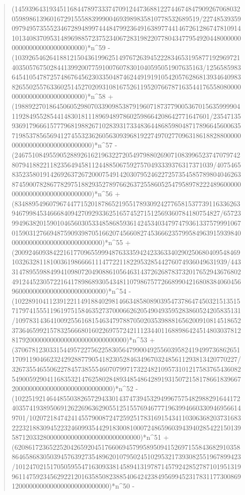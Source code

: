 \documentclass[11pt,a4paper]{article}
\theoremstyle{plain}
\theoremstyle{definition}
\begin{document}
\begin{quote}
(14593964319345116844789733374709124473688122744674847909267068032059898613960167291555883999004693989835810778532689519/22748539359097949573555234672894899744484799236491638977441467261286747810914101340837095314896988572375234067283198220778043477954920448000000000000000000000000000)*n\^{}59 - (103926546264188121504361996251497672639452228346531958771929697214035057675028441399200775910076078301040595051907635163/1256585983645410547872574867645623033504874624491919105420576286813934640983826550255763360251452702093108167526119520766787163544176558080000000000000000000000000)*n\^{}58 + (19889227018645060529807033909853879196071873779005367015635999904119284955285441483018111896948978602598664208642771647601/2354713593691796661577796819882671028393173348364486859804871789664560063571985378565694127455323626056309396819227497027709631861882880000000000000000000000000000)*n\^{}57 - (246751084955905288926162196322720549798802690710839965237470797428079418822118235649458112448850675927570493339376317371039/407546583523580191426926372672000754914203079524622725735458578980404626387459007828677829751882935278976626372558605254795897822248960000000000000000000000000000)*n\^{}56 + (83488954960796744771520187865219551789309242776581537739116336263946799845346668409427092933625165745271512569360784180754827/6572399496382015901046560305334858685936142453403479747936133757999106701590312766948759093987051662074566082745366623579958496391593984000000000000000000000000000)*n\^{}55 + (2009246093842216177096559994876333594242336334029025068040954846910326328118100361986666111477221182295328544276074936049631939/443314789559884994109807204908861056463143726268783732017652943676802491244523057221641789868930543481107986757726689904216808384060456960000000000000000000000000)*n\^{}54 - (10228910411239122114918840298146634858089039547378647450321513515717974155511961975158463527370006626205490493595283860524205835131/10978314364100925561681546347978870502035398881656200910814518652373646599215783256668016022697572421112344011688986424514803037812817920000000000000000000000000000)*n\^{}53 + (3706781230331544957227562258305647990049255603958241949973686265117091190466232429288779054182305284634967032485611293813420770227/32673554655062278457385554607079971732248210957310121758376543608254900592904116835321476258028489348548642891931507215817866183966720000000000000000000000000000)*n\^{}52 - (102251921464485503826572943301437473945329499675754829882916441724035741938950691262269636290551251557694677719639946603309469566149701/10207218474241455790087247259251783169154341103063682037316832223218830945223246099354429183008100072486596039439402854221501395871203328000000000000000000000000000)*n\^{}51 + (62086172365225204265920451766069457995895094152697155843682910358864658683050394576392735489620107950245102953217393082551967899423/101247021517050595547163093381458941319787145792428527871019513199611475923456292212016358508238854064242384956994523178311773008691200000000000000000000000000)*n\^{}50 - 
\end{quote}
\end{document}
